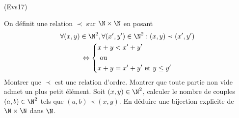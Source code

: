 \begin{tiny}(Evs17)\end{tiny} On définit une relation $\prec$ sur $\N\times \N$ en posant
\begin{multline*}
 \forall (x,y)\in \N^2, \forall (x',y')\in \N^2:
(x,y)\prec (x',y')\\
\Leftrightarrow
\left\lbrace 
\begin{aligned}
& x+y < x'+y'\\
&\text{ ou }\\
&x+y = x'+y' \text{ et } y\leq y'
\end{aligned}
\right. 
\end{multline*}
Montrer que $\prec$ est une relation d'ordre. Montrer que toute partie non vide admet un plus petit élément.\newline
Soit $(x,y)\in \N^2$, calculer le nombre de couples $(a,b)\in \N^2$ tels que $(a,b) \prec (x,y)$. En déduire une bijection explicite de $\N\times \N$ dans $\N$.